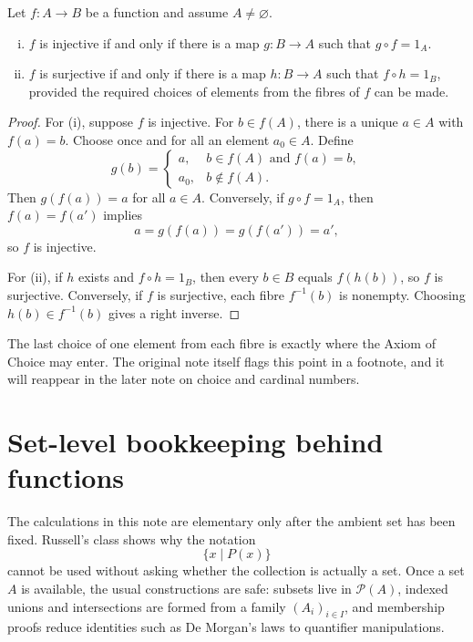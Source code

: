 \begin{theorem}
Let \(f:A\to B\) be a function and assume \(A\neq\varnothing\).
\begin{enumerate}[(i)]
  \item \(f\) is injective if and only if there is a map \(g:B\to A\) such that \(g\circ f=1_A\).
  \item \(f\) is surjective if and only if there is a map \(h:B\to A\) such that \(f\circ h=1_B\), provided the required choices of elements from the fibres of \(f\) can be made.
\end{enumerate}
\end{theorem}

\begin{proof}
For (i), suppose \(f\) is injective.  For \(b\in f(A)\), there is a unique \(a\in A\) with \(f(a)=b\).  Choose once and for all an element \(a_0\in A\).  Define
\[
  g(b)=
  \begin{cases}
    a, & b\in f(A)\text{ and }f(a)=b,\\
    a_0, & b\notin f(A).
  \end{cases}
\]
Then \(g(f(a))=a\) for all \(a\in A\).  Conversely, if \(g\circ f=1_A\), then \(f(a)=f(a')\) implies
\[
  a=g(f(a))=g(f(a'))=a',
\]
so \(f\) is injective.

For (ii), if \(h\) exists and \(f\circ h=1_B\), then every \(b\in B\) equals \(f(h(b))\), so \(f\) is surjective.  Conversely, if \(f\) is surjective, each fibre \(f^{-1}(b)\) is nonempty.  Choosing \(h(b)\in f^{-1}(b)\) gives a right inverse.
\end{proof}

\begin{caution}
The last choice of one element from each fibre is exactly where the Axiom of Choice may enter.  The original note itself flags this point in a footnote, and it will reappear in the later note on choice and cardinal numbers.
\end{caution}

\section{Set-level bookkeeping behind functions}

The calculations in this note are elementary only after the ambient set has been fixed.  Russell's class shows why the notation
\[
  \{x\mid P(x)\}
\]
cannot be used without asking whether the collection is actually a set.  Once a set \(A\) is available, the usual constructions are safe: subsets live in \(\mathcal P(A)\), indexed unions and intersections are formed from a family \((A_i)_{i\in I}\), and membership proofs reduce identities such as De Morgan's laws to quantifier manipulations.

